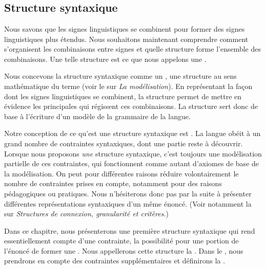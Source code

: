 \chapter{}\label{sec:3.2}

\section{Structure syntaxique}\label{sec:3.2.0}

Nous savons que les signes linguistiques se combinent pour former des signes linguistiques plus étendus. Nous souhaitons maintenant comprendre comment s’organisent les combinaisons entre signes et quelle structure forme l’ensemble des combinaisons. Une telle structure est ce que nous appelons une .

Nous concevons la structure syntaxique comme un , une structure au sens mathématique du terme (voir le  sur \textit{La modélisation}). En représentant la façon dont les signes linguistiques se combinent, la structure permet de mettre en évidence les principales  qui régissent ces combinaisons. La structure sert donc de base à l’écriture d’un modèle de la grammaire de la langue.

Notre conception de ce qu’est une structure syntaxique est . La langue obéit à un grand nombre de contraintes syntaxiques, dont une partie reste à découvrir. Lorsque nous proposons \textit{une} structure syntaxique, c’est toujours une modélisation partielle de ces contraintes, qui fonctionnent comme autant d’axiomes de base de la modélisation. On peut pour différentes raisons réduire volontairement le nombre de contraintes prises en compte, notamment pour des raisons pédagogiques ou pratiques. Nous n’hésiterons donc pas par la suite à présenter différentes représentations syntaxiques d’un même énoncé. (Voir notamment la  sur \textit{Structures de connexion, granularité et critères}.)

Dans ce chapitre, nous présenterons une première structure syntaxique qui rend essentiellement compte d’une contrainte, la possibilité pour une portion de l’énoncé de former une . Nous appellerons cette structure la . Dans le , nous prendrons en compte des contraintes supplémentaires et définirons la .

